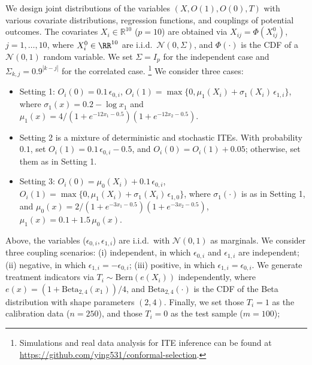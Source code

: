 We design joint distributions of the variables $(X,O(1),O(0),T)$
with various covariate distributions, regression functions,
and couplings of potential outcomes.
The covariates $X_i \in \mathbb{R}^{10}$ ($p = 10$)
are obtained via $X_{ij}=\Phi(X_{ij}^0)$, $j=1,\dots,10$,
where $X_{i}^0\in \RR^{10}$ are i.i.d.~$\mathcal{N}(0,\Sigma)$,
and $\Phi(\cdot)$ is the CDF of a $\mathcal{N}(0,1)$ random variable.
We set  $\Sigma=I_{p}$ for the independent case and $\Sigma_{k,j}=0.9^{|k-j|}$
for the correlated case. \footnote{Simulations and real data analysis for ITE inference
can be found at \href{https://github.com/ying531/conformal-selection}{https://github.com/ying531/conformal-selection}.}
We
consider three cases:
\begin{itemize}
    \item Setting 1:
    $
    O_i(0) = 0.1\, \epsilon_{0,i}$, $O_i(1) = \max\{ 0, \mu_1(X_i) + \sigma_1(X_i) \, \epsilon_{1,i} \}$, where
    $\sigma_1 (x) =   0.2 -  \log x_1$ and $ \mu_1(x) = {4}/{(1+e^{-12x_1-0.5})(1+e^{-12x_2-0.5})}$.
    \item Setting 2 is a mixture of deterministic and stochastic ITEs.
    With probability $0.1$, set $O_i(1)= 0.1\, \epsilon_{0,i}-0.5$, and $O_i(0)=O_i(1)+0.05$; otherwise, set them as in Setting 1.
    \item Setting 3: $O_i(0) = \mu_0(X_i) + 0.1 \, \epsilon_{0,i}$,
    $O_i(1)=\max\{0, \mu_1(X_i) + \sigma_1(X_i) \, \epsilon_{1,0}\}$, where $\sigma_1(\cdot)$ is as in Setting 1, and
    $
    \mu_0(x) = {2}/{(1+e^{-3x_1-0.5})(1+e^{-3x_2-0.5})}$, $
    \mu_1(x)=0.1+1.5\, \mu_0(x)$.
\end{itemize}
Above, the variables ($\epsilon_{0,i},\epsilon_{1,i}$) are i.i.d.~with $\mathcal{N}(0,1)$ as marginals.
We consider three coupling scenarios:
(i) independent, in which $\epsilon_{0,i}$ and $\epsilon_{1,i}$  are  independent;
(ii) negative, in which $\epsilon_{1,i}=-\epsilon_{0,i}$;
(iii) positive, in which  $\epsilon_{1,i} =\epsilon_{0,i}$.
We generate treatment indicators via
$T_i\sim \textrm{Bern}(e(X_i))$ independently,
where $e(x)= (1+\textrm{Beta}_{2,4}(x_1))/{4}$,
and $\textrm{Beta}_{2,4}(\cdot)$ is the CDF
of the Beta distribution with shape parameters $(2,4)$.
Finally, we set those $T_i=1$ as the calibration data ($n=250$),
and those $T_i=0$ as the test sample ($m=100$);
